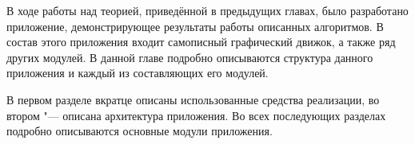 В ходе работы над теорией, приведённой в предыдущих главах, было разработано приложение, демонстрирующее результаты
работы описанных алгоритмов. В состав этого приложения входит самописный графический движок, а также ряд других модулей.
В данной главе подробно описываются структура данного приложения и каждый из составляющих его модулей.

В первом разделе вкратце описаны использованные средства реализации, во втором "--- описана архитектура
приложения. Во всех последующих разделах подробно описываются основные модули приложения.
